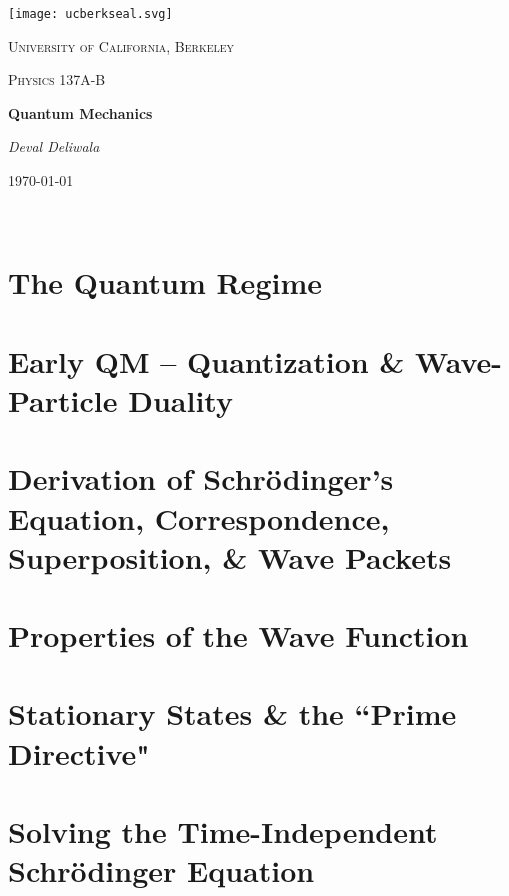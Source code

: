 \documentclass[10pt,letterpaper, twocolumn]{report}
\begin{document}
\begin{titlepage}
	\centering
	\texttt{[image: ucberkseal.svg]}\par\vspace{1cm}
	{\LARGE \textsc{University of California, Berkeley}\par}
	\vspace{1cm}
	{\Large \textsc{Physics 137A-B}\par}
	\vspace{1.5cm}
	{\huge\bfseries Quantum Mechanics \par}
	\vspace{2cm}
	{\Large\itshape Deval Deliwala\par}
	\vfill
	\vfill
	{\large \today\par}
\end{titlepage}

\newpage\
\newpage\
\tableofcontents
\newpage\

\chapter{The Quantum Regime}

\chapter{Early QM -- Quantization \& Wave-Particle Duality}

\chapter{Derivation of Schr\"odinger's Equation, Correspondence, Superposition,
\& Wave Packets}

\chapter{Properties of the Wave Function}

\chapter{Stationary States \& the ``Prime Directive"}

\chapter{Solving the Time-Independent Schr\"odinger Equation}

\end{document}
